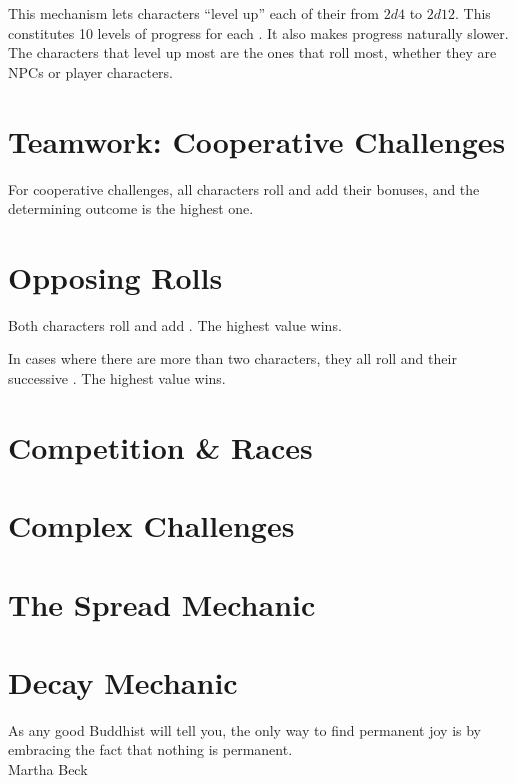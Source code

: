 This mechanism lets characters ``level up'' each of their  from $2d4$ to $2d12$.
This constitutes 10 levels of progress for each .
It also makes progress naturally slower.
The characters that level up most are the ones that roll most, whether they are NPCs or player characters.


\section{Teamwork: Cooperative Challenges}

For cooperative challenges, all characters roll and add their bonuses, and the determining outcome is the highest one.


\section{Opposing Rolls}

Both characters roll and add . The highest value wins.

In cases where there are more than two characters, they all roll and their successive .
The highest value wins.

\section{Competition \& Races}

\section{Complex Challenges}



\section{The Spread Mechanic}

\section{Decay Mechanic}

\begin{emphasisParagraph}
As any good Buddhist will tell you, the only way to find permanent joy is by embracing the fact that nothing is permanent.\\
Martha Beck
\end{emphasisParagraph}

